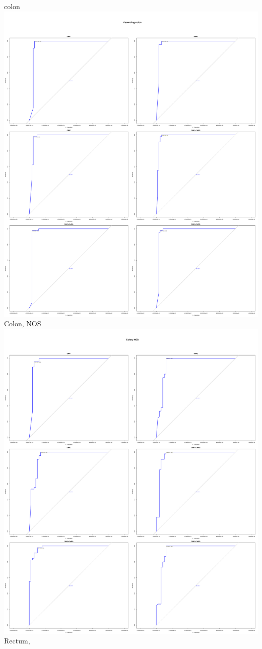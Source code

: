 \documentclass[openany]{book}
\begin{document}
colon\includegraphics{book1_files/figure-latex/plots-3.pdf} Colon,
NOS\includegraphics{book1_files/figure-latex/plots-4.pdf} Rectum,
\end{document}
